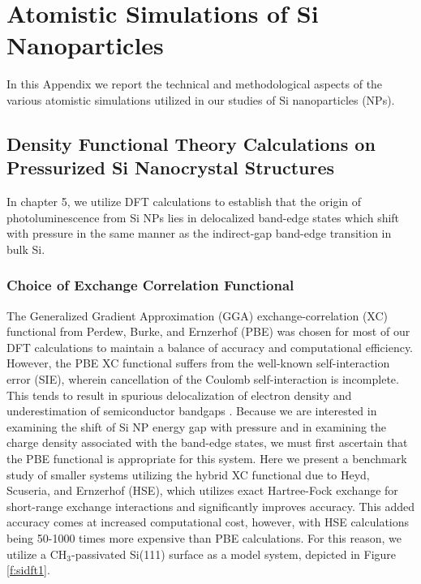 \chapter{Atomistic Simulations of Si Nanoparticles}

In this Appendix we report the technical and methodological aspects of the various atomistic simulations utilized in our studies of Si nanoparticles (NPs).

\section{Density Functional Theory Calculations on Pressurized Si Nanocrystal Structures}
In chapter 5, we utilize DFT calculations to establish that the origin of photoluminescence from Si NPs lies in delocalized band-edge states which shift with pressure in the same manner as the indirect-gap band-edge transition in bulk Si. 

\subsection{Choice of Exchange Correlation Functional}
The Generalized Gradient Approximation (GGA) exchange-correlation (XC) functional from Perdew, Burke, and Ernzerhof (PBE) \cite{PhysRevLett.77.3865} was chosen for most of our DFT calculations to maintain a balance of accuracy and computational efficiency. However, the PBE XC functional suffers from the well-known self-interaction error (SIE), wherein cancellation of the Coulomb self-interaction is incomplete. This tends to result in spurious delocalization of electron density and underestimation of semiconductor bandgaps  \cite{cohen2008insights, PhysRevLett.100.146401}. Because we are interested in examining the shift of Si NP energy gap with pressure and in examining the charge density associated with the band-edge states, we must first ascertain that the PBE functional is appropriate for this system. Here we present a benchmark study of smaller systems utilizing the hybrid XC functional due to Heyd, Scuseria, and Ernzerhof (HSE), which utilizes exact Hartree-Fock exchange for short-range exchange interactions and significantly improves accuracy. This added accuracy comes at increased computational cost, however, with HSE calculations being 50-1000 times more expensive than PBE calculations. For this reason, we utilize a CH$_3$-passivated Si(111) surface as a model system, depicted in Figure \ref{f:sidft1}.

